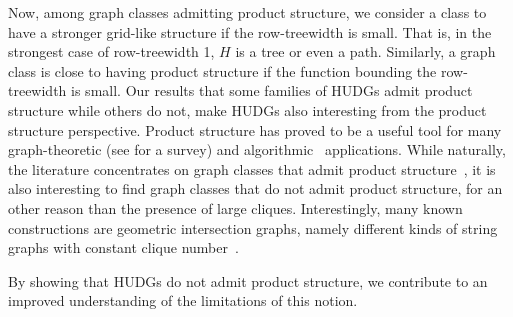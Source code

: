 \documentclass[11pt]{article}
\providecommand{\todo}[2][]{}
\newcommand{\thomas}[1]{}
\begin{document}
Now, among graph classes admitting product structure, we consider a class to have a stronger grid-like structure if the row-treewidth is small.
That is, in the strongest case of row-treewidth 1, $ H $ is a tree or even a path.
Similarly, a graph class is close to having product structure if the function bounding the row-treewidth is small.
%
Our results that some families of HUDGs admit product structure while others do not, 
make HUDGs also interesting from the product structure perspective.
Product structure has proved to be a useful tool for many graph-theoretic (see \cite{hickingbotham_shallow_2024} for a survey) and algorithmic~\cite{an_PS_algo_application_2025,bose_optimal_2022} applications.
While naturally, the literature concentrates on graph classes that admit product structure~\cite{dujmovic_planar_2019,campbell_product_2022,hickingbotham_shallow_2024,hickingbotham_product_2024,distel_improved_2022,dujmovic_graph_2023}, it is also interesting to find graph classes that do not admit product structure, for an other reason than the presence of large cliques.
Interestingly, many known constructions are geometric intersection graphs, namely different kinds of string graphs with constant clique number~\cite{merker_intersection_2024,karol_string_product_structure_2025}.
\todo{add non-geometry graph classes? \cite{bose_ltw_rtw_2022}, apex-grids (e.g. $ K_6 $-minor free graphs), 3-regular graphs, 1-gap planar graphs, and 3-quasi planar graphs}
By showing that HUDGs do not admit product structure, we contribute to an improved understanding of the limitations of this notion.
%
%
\end{document}
